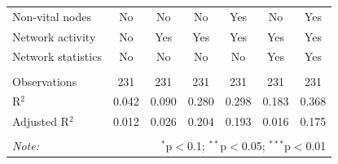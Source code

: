 \begin{table}[!htbp]
\begin{tabular}{@{\extracolsep{5pt}}lcccccc}
Non-vital nodes & No & No & No & Yes & No & Yes \\ 
Network activity & No & Yes & Yes & Yes & Yes & Yes \\ 
Network statistics & No & No & No & No & Yes & Yes \\ 
\hline &  &  &  &  &  &  \\ 
Observations & 231 & 231 & 231 & 231 & 231 & 231 \\ 
R$^{2}$ & 0.042 & 0.090 & 0.280 & 0.298 & 0.183 & 0.368 \\ 
Adjusted R$^{2}$ & 0.012 & 0.026 & 0.204 & 0.193 & 0.016 & 0.175 \\ 
\hline 
\hline \\[-1.8ex] 
\textit{Note:}  & \multicolumn{6}{r}{$^{*}$p$<$0.1; $^{**}$p$<$0.05; $^{***}$p$<$0.01} \\ 
\end{tabular} 
\end{table} 
